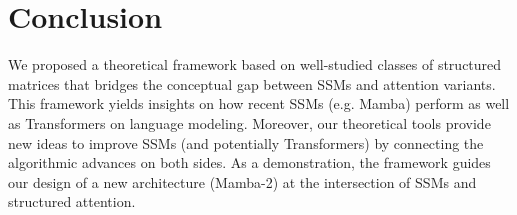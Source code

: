 \section{Conclusion}
\label{sec:conclusion}

We proposed a theoretical framework based on well-studied classes of structured
matrices that bridges the conceptual gap between SSMs and attention variants.
This framework yields insights on how recent SSMs (e.g. Mamba) perform as well
as Transformers on language modeling.
Moreover, our theoretical tools provide new ideas to improve SSMs (and
potentially Transformers) by connecting the algorithmic\iftoggle{arxiv}{ and systems}{} advances on
both sides.
As a demonstration, the framework guides our design of a new architecture
(Mamba-2) at the intersection of SSMs and structured attention.





